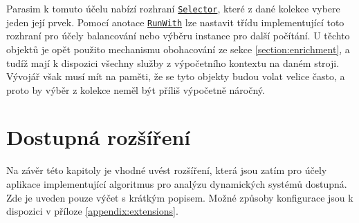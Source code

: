 Parasim k tomuto účelu nabízí rozhraní \href{https://github.com/sybila/parasim/blob/master/extensions/computation-lifecycle-api/src/main/java/org/sybila/parasim/computation/lifecycle/api/Selector.java}{\texttt{Selector}}, které z dané kolekce vybere jeden její prvek. Pomocí anotace \href{https://github.com/sybila/parasim/blob/master/extensions/computation-lifecycle-api/src/main/java/org/sybila/parasim/computation/lifecycle/api/annotations/RunWith.java}{\texttt{RunWith}} lze nastavit třídu implementující toto rozhraní
pro účely balancování nebo výběru instance pro další počítání. U těchto objektů je opět použito mechanismu obohacování ze sekce \ref{section:enrichment},
a tudíž mají k dispozici všechny služby z výpočetního kontextu na daném stroji.
Vývojář však musí mít na paměti, že se tyto objekty budou volat velice často, 
a proto by výběr z kolekce neměl být příliš výpočetně náročný.


\section{Dostupná rozšíření}

Na závěr této kapitoly je vhodné uvést rozšíření, která jsou zatím pro účely aplikace
implementující algoritmus pro analýzu dynamických systémů dostupná. Zde je uveden pouze výčet
s krátkým popisem. Možné způsoby konfigurace jsou k dispozici v příloze \ref{appendix:extensions}.

